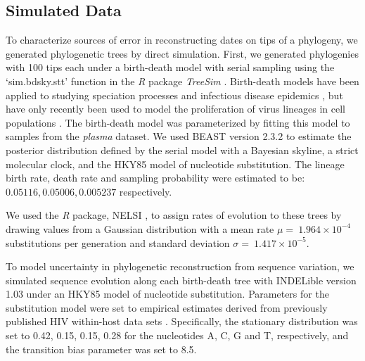 \documentclass[12pt]{article}
\begin{document}
\subsection * {Simulated Data} \label{subsec:simdata}


To characterize sources of error in reconstructing dates on tips of a phylogeny, we generated phylogenetic trees by direct simulation. %
First, we generated phylogenies with 100 tips each under a birth-death model with serial sampling using the `sim.bdsky.stt' function in the \textit{R} package \textit{TreeSim} \citep{Boskova14}.
Birth-death models have been applied to studying speciation processes \citep{Nee:2006} and infectious disease epidemics \citep{Stradler13}, but have only recently been used to model the proliferation of virus lineages in cell populations \citep{Hartfield:2015}.
The birth-death model was parameterized by fitting this model to samples from the {\em plasma} dataset.
We used BEAST version 2.3.2 to estimate the posterior distribution defined by the serial model with a Bayesian skyline, a strict molecular clock, and the HKY85 \citep{HKY85} model of nucleotide substitution.
The lineage birth rate, death rate and sampling probability were estimated to be: $0.05116, 0.05006, 0.005237$ respectively.

We used the \textit{R} package, NELSI \citep{NELSI}, to assign rates of evolution to these trees by drawing values from a Gaussian distribution with a mean rate $\mu = \ 1.964\times 10^{-4}$ substitutions per generation and standard deviation $\sigma = \ 1.417\times 10^{-5}$. %

To model uncertainty in phylogenetic reconstruction from sequence variation, we simulated sequence evolution along each birth-death tree with INDELible version 1.03 \citep{Indelible09} under an HKY85 \citep{HKY85} model of nucleotide substitution.
Parameters for the substitution model were set to empirical estimates derived from previously published HIV within-host data sets \citep{McCloskey14}. 
Specifically, the stationary distribution was set to 0.42, 0.15, 0.15, 0.28 for the nucleotides A, C, G and T, respectively, and the transition bias parameter was set to 8.5.
\end{document}
